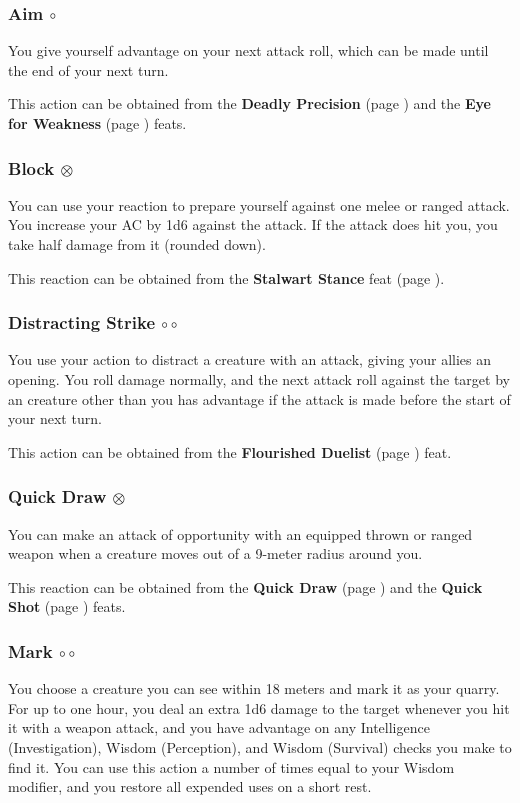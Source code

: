     \subsubsection{Aim $\circ$} \label{act::aim}
        You give yourself advantage on your next attack roll, which can be made until the end of your next turn.

        This action can be obtained from the \textbf{Deadly Precision} (page \pageref{feat::deadlyprecision}) and the \textbf{Eye for Weakness} (page \pageref{feat::eyeforweakness}) feats.
    \subsubsection{Block $\otimes$} \label{act::block}
        You can use your reaction to prepare yourself against one melee or ranged attack.
        You increase your AC by 1d6 against the attack.
        If the attack does hit you, you take half damage from it (rounded down).

        This reaction can be obtained from the \textbf{Stalwart Stance} feat (page \pageref{feat::stalwartstance}).
    \subsubsection{Distracting Strike $\circ\circ$} \label{act::distractingstrike}
        You use your action to distract a creature with an attack, giving your allies an opening.
        You roll damage normally, and the next attack roll against the target by an creature other than you has advantage if the attack is made before the start of your next turn.

        This action can be obtained from the \textbf{Flourished Duelist} (page \pageref{feat::flourishedduelist}) feat.
    \subsubsection{Quick Draw $\otimes$} \label{act::quickdraw}
        You can make an attack of opportunity with an equipped thrown or ranged weapon when a creature moves out of a 9-meter radius around you.

        This reaction can be obtained from the \textbf{Quick Draw} (page \pageref{feat::quickdraw}) and the \textbf{Quick Shot} (page \pageref{feat::quickshot}) feats.
    \subsubsection{Mark $\circ\circ$} \label{act::mark}
        You choose a creature you can see within 18 meters and mark it as your quarry.
        For up to one hour, you deal an extra 1d6 damage to the target whenever you hit it with a weapon attack, and you have advantage on any Intelligence (Investigation), Wisdom (Perception), and Wisdom (Survival) checks you make to find it.
        You can use this action a number of times equal to your Wisdom modifier, and you restore all expended uses on a short rest.

